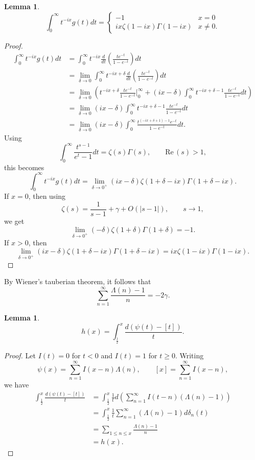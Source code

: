 \documentclass{article}
\def\Re{\ensuremath{\mathrm{Re}}\,}
\newtheorem{lemma}[theorem]{Lemma}
\begin{document}
\begin{lemma}
\[
\int_0^\infty t^{-ix} g(t) dt =\begin{cases}
-1&x=0\\
 ix \zeta(1-ix)\Gamma(1-ix)&x \neq 0.
 \end{cases}
\]
\end{lemma}
\begin{proof}
\begin{align*}
\int_0^\infty t^{-ix} g(t) dt&=\int_0^\infty t^{-ix}  \frac{d}{dt} \left( \frac{te^{-t}}{1-e^{-t}} \right) dt\\
&=\lim_{\delta \to 0} \int_0^\infty t^{-ix+\delta}  \frac{d}{dt} \left( \frac{te^{-t}}{1-e^{-t}} \right) dt\\
&=\lim_{\delta \to 0} \left( t^{-ix+\delta} \frac{te^{-t}}{1-e^{-t}} \bigg |_0^\infty 
+(ix-\delta) \int_0^\infty  t^{-ix+\delta-1} \frac{te^{-t}}{1-e^{-t}} dt \right)\\
&=\lim_{\delta \to 0} (ix-\delta)  \int_0^\infty  t^{-ix+\delta-1} \frac{te^{-t}}{1-e^{-t}} dt\\
&=\lim_{\delta \to 0} (ix-\delta)  \int_0^\infty   \frac{t^{(-ix+\delta+1)-1}e^{-t}}{1-e^{-t}} dt.
\end{align*}
Using
\[
\int_0^\infty \frac{t^{s-1}}{e^t-1} dt = \zeta(s) \Gamma(s), \qquad \Re(s)>1,
\]
this becomes
\[
\int_0^\infty t^{-ix} g(t) dt=\lim_{\delta \to 0^+} (ix-\delta) \zeta(1+\delta-ix)\Gamma(1+\delta-ix).
\]
If $x=0$, then
using 
\[
\zeta(s) = \frac{1}{s-1}+\gamma +O(|s-1|), \qquad s \to 1,
\]
we get
\[
\lim_{\delta \to 0^+} (-\delta) \zeta(1+\delta)\Gamma(1+\delta) = -1.
\]
If $x>0$, then
\[
\lim_{\delta \to 0^+} (ix-\delta) \zeta(1+\delta-ix)\Gamma(1+\delta-ix) = 
ix\zeta(1-ix)\Gamma(1-ix).
\]
\end{proof}


By Wiener's tauberian theorem, it follows that
\[
\sum_{n=1}^\infty \frac{\Lambda(n)-1}{n} = -2\gamma.
\]

\begin{lemma}
\[
h(x) = \int_{\frac{1}{2}}^x \frac{d(\psi(t)-[t])}{t}.
\]
\end{lemma}
\begin{proof}
Let $I(t)=0$ for $t < 0$ and $I(t)=1$ for $t \geq 0$. Writing
\[
\psi(x) = \sum_{n=1}^\infty I(x-n) \Lambda(n),
\qquad [x]=
\sum_{n=1}^\infty I(x-n),
\]
we have
\begin{align*}
 \int_{\frac{1}{2}}^x \frac{d(\psi(t)-[t])}{t}
&= \int_{\frac{1}{2}}^x 
\frac{1}{t} d\left(\sum_{n=1}^\infty I(t-n) (\Lambda(n)-1)\right)\\
&= \int_{\frac{1}{2}}^x  \frac{1}{t} 
\sum_{n=1}^\infty (\Lambda(n)-1) d \delta_n(t)\\
&=\sum_{1 \leq n \leq x} \frac{\Lambda(n)-1}{n}\\
&=h(x).
\end{align*}
\end{proof}
\end{document}
